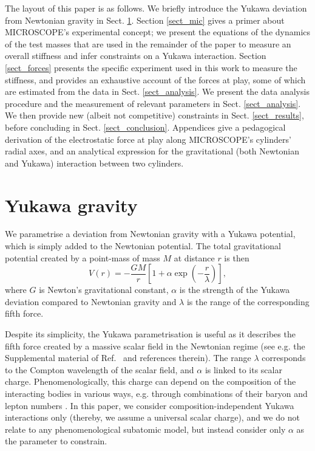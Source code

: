 \documentclass[12pt]{iopart}
\begin{document}
The layout of this paper is as follows. We briefly introduce the Yukawa deviation from Newtonian gravity in Sect. \ref{sect_yukawa}.
Section \ref{sect_mic} gives a primer about MICROSCOPE's experimental concept; we present the equations of the dynamics of the test masses that are used in the remainder of the paper to measure an overall stiffness and infer constraints on a Yukawa interaction.
Section \ref{sect_forces} presents the specific experiment used in this work to measure the stiffness, and provides an exhaustive account of the forces at play, some of which are estimated from the data in Sect. \ref{sect_analysis}.
We present the data analysis procedure and the measurement of relevant parameters in Sect. \ref{sect_analysis}. We then provide new (albeit not competitive) constraints in Sect. \ref{sect_results}, before concluding in Sect. \ref{sect_conclusion}. Appendices give a pedagogical derivation of the electrostatic force at play along MICROSCOPE's cylinders' radial axes, and an analytical expression for the gravitational (both Newtonian and Yukawa) interaction between two cylinders.



\section{Yukawa gravity} \label{sect_yukawa}

We parametrise a deviation from Newtonian gravity with a Yukawa potential, which is simply added to the Newtonian potential. The total gravitational potential created by a point-mass of mass $M$ at distance $r$ is then
\begin{equation} \label{eq_yukawa_pm}
V(r) = -\frac{GM}{r} \left[1+\alpha \exp\left(-\frac{r}{\lambda}\right) \right],
\end{equation}
where $G$ is Newton's gravitational constant, $\alpha$ is the strength of the Yukawa deviation compared to Newtonian gravity and $\lambda$ is the range of the corresponding fifth force.

Despite its simplicity, the Yukawa parametrisation is useful as it describes the fifth force created by a massive scalar field in the Newtonian regime (see e.g. the Supplemental material of Ref.~\cite{berge18} and references therein).
The range $\lambda$ corresponds to the Compton wavelength of the scalar field, and $\alpha$ is linked to its scalar charge. Phenomenologically, this charge can depend on the composition of the interacting bodies in various ways, e.g. through combinations of their baryon and lepton numbers \cite{fischbach99}. In this paper, we consider composition-independent Yukawa interactions only (thereby, we assume a universal scalar charge), and we do not relate to any phenomenological subatomic model, but instead consider only $\alpha$ as the parameter to constrain.
\end{document}
